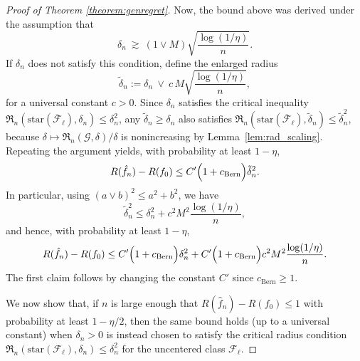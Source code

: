 \documentclass[11pt]{article}
\theoremstyle{plain}
\theoremstyle{definition} %
\begin{document}
\begin{proof}[Proof of Theorem \ref{theorem:genregret}]
Now, the bound above was derived under the assumption that
\[
\delta_n \ \gtrsim\ (1 \vee M) \sqrt{\frac{\log(1/\eta)}{n}}.
\]
If \(\delta_n\) does not satisfy this condition, define the enlarged radius
\[
\tilde\delta_n := \delta_n \ \vee\ c\,M\sqrt{\frac{\log(1/\eta)}{n}},
\]
for a universal constant \(c>0\). Since \(\delta_n\) satisfies the critical inequality
\(\mathfrak{R}_n(\mathrm{star}(\overline{\mathcal{F}}_{\ell}),\delta_n)\le \delta_n^2\), any
\(\tilde\delta_n\ge \delta_n\) also satisfies
\(\mathfrak{R}_n(\mathrm{star}(\overline{\mathcal{F}}_{\ell}),\tilde\delta_n)\le \tilde\delta_n^2\),
because \(\delta \mapsto \mathfrak{R}_n(\mathcal{G},\delta)/\delta\) is nonincreasing by
Lemma~\ref{lem:rad_scaling}. Repeating the argument yields, with probability at least \(1-\eta\),
\[
R(\hat f_n)-R(f_0)
\le
C'\Bigl(1+c_{\mathrm{Bern}}\Bigr)\tilde\delta_n^2.
\]
In particular, using \((a\vee b)^2\le a^2+b^2\), we have
\[
\tilde\delta_n^2
\le
\delta_n^2 + c^2 M^2\frac{\log(1/\eta)}{n},
\]
and hence, with probability at least \(1-\eta\),
\[
R(\hat f_n)-R(f_0)
\le
C'\Bigl(1+c_{\mathrm{Bern}}\Bigr)\delta_n^2
+
C'\Bigl(1+c_{\mathrm{Bern}}\Bigr)c^2 M^2\frac{\log(1/\eta)}{n}.
\]
The first claim follows by changing the constant $C'$ since $c_{\mathrm{Bern}} \geq 1$.



We now show that, if \(n\) is large enough that \(R(\hat f_n)-R(f_0)\le 1\) with probability
at least \(1-\eta/2\), then the same bound holds (up to a universal constant) when \(\delta_n>0\)
is instead chosen to satisfy the critical radius condition
\(\mathfrak{R}_n(\mathrm{star}(\mathcal{F}_{\ell}),\delta_n)\le \delta_n^2\) for the uncentered
class \(\mathcal{F}_{\ell}\).


\end{proof}
\end{document}
